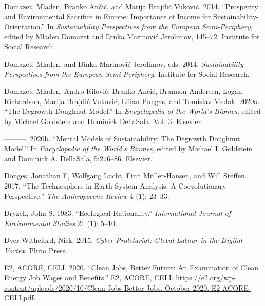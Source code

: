 \documentclass[a4paper, nobind]{templates/ociamthesis}
\newlength{\cslhangindent}
\newenvironment{CSLReferences}[2] %
 {%
  \setlength{\parindent}{0pt}
  \ifodd #1
  \let\oldpar\par
  \def\par{\hangindent=\cslhangindent\oldpar}
  \fi
  \setlength{\parskip}{1mm}
  \setlength{\baselineskip}{6mm}
 }%
 {}
\begin{document}
\begin{CSLReferences}{1}{0}
\leavevmode{}%
Domazet, Mladen, Branko Ančić, and Marija Brajdić Vuković. 2014. {``Prosperity and Environmental Sacrifice in {Europe}: Importance of Income for Sustainability-Orientation.''} In \emph{Sustainability Perspectives from the {European} Semi-Periphery}, edited by Mladen Domazet and Dinka Marinović Jerolimov, 145--72. {Institute for Social Research}.

\leavevmode{}%
Domazet, Mladen, and Dinka Marinović Jerolimov, eds. 2014. \emph{Sustainability Perspectives from the {European} Semi-Periphery}. {Institute for Social Research}.

\leavevmode{}%
Domazet, Mladen, Andro Rilović, Branko Ančić, Brannon Andersen, Logan Richardson, Marija Brajdić Vuković, Lilian Pungas, and Tomislav Medak. 2020a. {``The {Degrowth Doughnut Model}.''} In \emph{Encyclopedia of the {World}'s {Biomes}}, edited by Michael Goldstein and Dominick DellaSala. Vol. 3. {Elsevier}.

\leavevmode{}%
---------. 2020b. {``Mental {Models} of {Sustainability}: {The Degrowth Doughnut Model}.''} In \emph{Encyclopedia of the {World}'s {Biomes}}, edited by Michael I. Goldstein and Dominick A. DellaSala, 5:276--86. {Elsevier}.

\leavevmode{}%
Donges, Jonathan F, Wolfgang Lucht, Finn Müller-Hansen, and Will Steffen. 2017. {``The Technosphere in {Earth System} Analysis: {A} Coevolutionary Perspective.''} \emph{The Anthropocene Review} 4 (1): 23--33.

\leavevmode{}%
Dryzek, John S. 1983. {``Ecological Rationality.''} \emph{International Journal of Environmental Studies} 21 (1): 5--10.

\leavevmode{}%
Dyer-Witheford, Nick. 2015. \emph{Cyber-{Proletariat}: {Global Labour} in the {Digital Vortex}}. {Pluto Press}.

\leavevmode{}%
E2, ACORE, CELI. 2020. {``Clean Jobs, Better Future: {An} Examination of Clean Energy Job Wages and Benefits.''} {E2, ACORE, CELI}. \url{https://e2.org/wp-content/uploads/2020/10/Clean-Jobs-Better-Jobs.-October-2020.-E2-ACORE-CELI.pdf}.


\end{CSLReferences}
\end{document}

